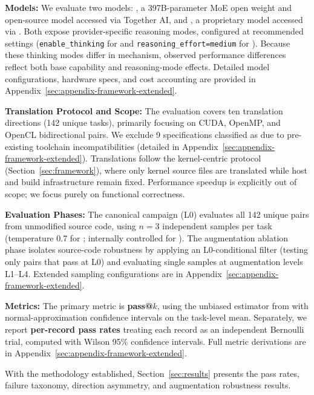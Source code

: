 \textbf{Models:} We evaluate two models: \qwen{}, a 397B-parameter MoE open weight and open-source model accessed via Together AI, and \gptnew{}, a proprietary model accessed via \gptprovider{}. Both expose provider-specific reasoning modes, configured at recommended settings (\texttt{enable\_thinking} for \qwenshort{} and \texttt{reasoning\_effort=medium} for \gptnew{}). Because these thinking modes differ in mechanism, observed performance differences reflect both base capability and reasoning-mode effects. Detailed model configurations, hardware specs, and cost accounting are provided in Appendix~\ref{sec:appendix-framework-extended}.

\textbf{Translation Protocol and Scope:} The evaluation covers ten translation directions (142 unique tasks), primarily focusing on CUDA, OpenMP, and OpenCL bidirectional pairs. We exclude 9 specifications classified as \knownfail{} due to pre-existing toolchain incompatibilities (detailed in Appendix~\ref{sec:appendix-framework-extended}). Translations follow the kernel-centric protocol (Section~\ref{sec:framework}), where only kernel source files are translated while host and build infrastructure remain fixed. Performance speedup is explicitly out of scope; we focus purely on functional correctness.

\textbf{Evaluation Phases:} The canonical campaign (L0) evaluates all 142 unique pairs from unmodified source code, using $n=3$ independent samples per task (temperature 0.7 for \qwenshort{}; internally controlled for \gptnew{}). The augmentation ablation phase isolates source-code robustness by applying an L0-conditional filter (testing only pairs that pass at L0) and evaluating single samples at augmentation levels L1--L4. Extended sampling configurations are in Appendix~\ref{sec:appendix-framework-extended}.

\textbf{Metrics:} The primary metric is \textbf{pass@$k$}, using the unbiased estimator from \citet{HumanEval2021} with normal-approximation confidence intervals on the task-level mean. Separately, we report \textbf{per-record pass rates} treating each record as an independent Bernoulli trial, computed with Wilson 95\% confidence intervals. Full metric derivations are in Appendix~\ref{sec:appendix-framework-extended}.

With the methodology established, Section~\ref{sec:results} presents the pass rates, failure taxonomy, direction asymmetry, and augmentation robustness results.

